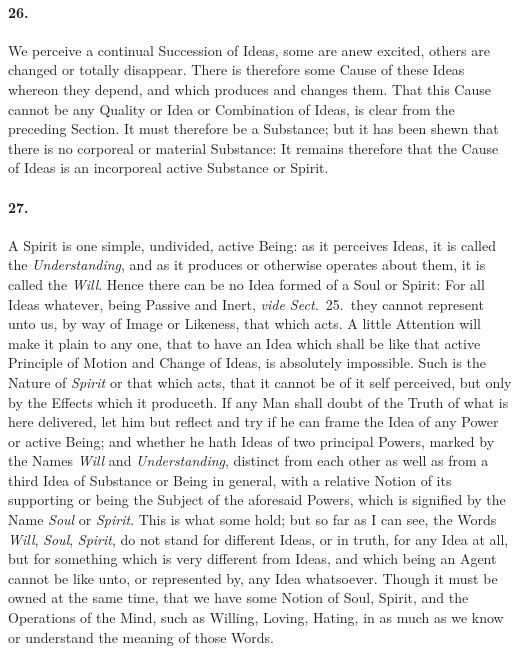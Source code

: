 \documentclass[]{article}
\newenvironment{sectionbody}{}{}
\begin{document}
\begin{sectionbody}
\paragraph{26.} We perceive a continual Succession of Ideas, some are anew
excited, others are changed or totally disappear.  There is
therefore some Cause of these Ideas whereon they depend, and
which produces and changes them.  That this Cause cannot be any
Quality or Idea or Combination of Ideas, is clear from the
preceding Section.  It must therefore be a Substance; but it has
been shewn that there is no corporeal or material Substance: It
remains therefore that the Cause of Ideas is an incorporeal
active Substance or Spirit.



\paragraph{27.} A Spirit is one simple, undivided, active Being: as it perceives
Ideas, it is called the \emph{Understanding}, and as it
produces or otherwise operates about them, it is called the
\emph{Will}.  Hence there can be no Idea formed of a
Soul or Spirit: For all Ideas whatever, being Passive and Inert,
\emph{vide Sect.}~25.\ they cannot represent unto us, by way of
Image or Likeness, that
which acts.  A little Attention will make it plain to any one,
that to have an Idea which shall be like that active Principle of
Motion and Change of Ideas, is absolutely impossible.  Such is
the Nature of \emph{Spirit} or that which acts, that it cannot
be of it self perceived, but only by the Effects which it
produceth.  If any Man shall doubt of the Truth of what is here
delivered, let him but reflect and try if he can frame the Idea
of any Power or active Being; and whether he hath Ideas of two
principal Powers, marked by the Names \emph{Will} and
\emph{Understanding}, distinct from each other as well as from
a third Idea of Substance or Being in general, with a relative
Notion of its supporting or being the Subject of the aforesaid
Powers, which is signified by the Name \emph{Soul} or
\emph{Spirit}.  This is what some hold; but so far as I can
see, the Words \emph{Will}, \emph{Soul}, \emph{Spirit}, do
not stand for different Ideas, or in truth, for any Idea at all,
but for something which is very different from Ideas, and which
being an Agent cannot be like unto, or represented by, any Idea
whatsoever.  Though it must be owned at the same time, that we
have some Notion of Soul, Spirit, and the Operations of the Mind,
such as Willing, Loving, Hating, in as much as we know or
understand the meaning of those Words.




\end{sectionbody}
\end{document}
